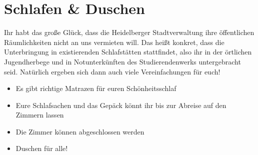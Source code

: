 \section{Schlafen \& Duschen}
  Ihr habt das große Glück, dass die Heidelberger Stadtverwaltung ihre öffentlichen Räumlichkeiten nicht
  an uns vermieten will.
  Das heißt konkret, dass die Unterbringung in existierenden Schlafstätten stattfindet, also ihr
  in der örtlichen Jugendherbege und in Notunterkünften des Studierendenwerks untergebracht seid.
  Natürlich ergeben sich dann auch viele Vereinfachungen für euch! \\
  \begin{itemize}
    \item Es gibt richtige Matrazen für euren Schönheitsschlaf
    \item Eure Schlafsachen und das Gepäck könnt ihr bis zur Abreise auf den Zimmern lassen
    \item Die Zimmer können abgeschlossen werden
    \item Duschen für alle!
  \end{itemize}

